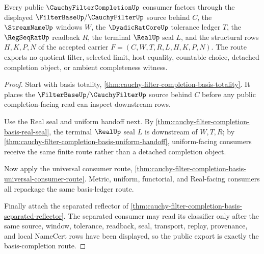 \begin{theorem}
\label{thm:cauchyfiltercompletion-public-basis-completion-route}
Every public $\CauchyFilterCompletionUp$ consumer factors through the displayed $\FilterBaseUp/\CauchyFilterUp$ source behind $C$, the $\StreamNameUp$ windows $W$, the $\DyadicRatCoreUp$ tolerance ledger $T$, the $\RegSeqRatUp$ readback $R$, the terminal $\RealUp$ seal $L$, and the structural rows $H,K,P,N$ of the accepted carrier $F=(C,W,T,R,L,H,K,P,N)$. The route exports no quotient filter, selected limit, host equality, countable choice, detached completion object, or ambient completeness witness.
\end{theorem}
\begin{proof}
Start with basis totality, \autoref{thm:cauchy-filter-completion-basis-totality}. It places the $\FilterBaseUp/\CauchyFilterUp$ source behind $C$ before any public completion-facing read can inspect downstream rows.

Use the Real seal and uniform handoff next. By \autoref{thm:cauchy-filter-completion-basis-real-seal}, the terminal $\RealUp$ seal $L$ is downstream of $W,T,R$; by \autoref{thm:cauchy-filter-completion-basis-uniform-handoff}, uniform-facing consumers receive the same finite route rather than a detached completion object.

Now apply the universal consumer route, \autoref{thm:cauchy-filter-completion-basis-universal-consumer-route}. Metric, uniform, functorial, and Real-facing consumers all repackage the same basis-ledger route.

Finally attach the separated reflector of \autoref{thm:cauchy-filter-completion-basis-separated-reflector}. The separated consumer may read its classifier only after the same source, window, tolerance, readback, seal, transport, replay, provenance, and local NameCert rows have been displayed, so the public export is exactly the basis-completion route.
\end{proof}

